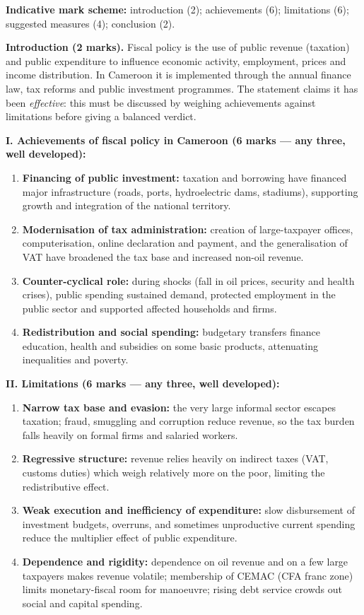 \documentclass[11pt]{article}
\begin{document}
\begin{corrige}
\textbf{Indicative mark scheme:} introduction (2); achievements (6); limitations (6); suggested measures (4); conclusion (2).

\textbf{Introduction (2 marks).} Fiscal policy is the use of public revenue (taxation) and public expenditure to influence economic activity, employment, prices and income distribution. In Cameroon it is implemented through the annual finance law, tax reforms and public investment programmes. The statement claims it has been \emph{effective}: this must be discussed by weighing achievements against limitations before giving a balanced verdict.

\textbf{I. Achievements of fiscal policy in Cameroon (6 marks — any three, well developed):}
\begin{enumerate}
\item \textbf{Financing of public investment:} taxation and borrowing have financed major infrastructure (roads, ports, hydroelectric dams, stadiums), supporting growth and integration of the national territory.
\item \textbf{Modernisation of tax administration:} creation of large-taxpayer offices, computerisation, online declaration and payment, and the generalisation of VAT have broadened the tax base and increased non-oil revenue.
\item \textbf{Counter-cyclical role:} during shocks (fall in oil prices, security and health crises), public spending sustained demand, protected employment in the public sector and supported affected households and firms.
\item \textbf{Redistribution and social spending:} budgetary transfers finance education, health and subsidies on some basic products, attenuating inequalities and poverty.
\end{enumerate}

\textbf{II. Limitations (6 marks — any three, well developed):}
\begin{enumerate}
\item \textbf{Narrow tax base and evasion:} the very large informal sector escapes taxation; fraud, smuggling and corruption reduce revenue, so the tax burden falls heavily on formal firms and salaried workers.
\item \textbf{Regressive structure:} revenue relies heavily on indirect taxes (VAT, customs duties) which weigh relatively more on the poor, limiting the redistributive effect.
\item \textbf{Weak execution and inefficiency of expenditure:} slow disbursement of investment budgets, overruns, and sometimes unproductive current spending reduce the multiplier effect of public expenditure.
\item \textbf{Dependence and rigidity:} dependence on oil revenue and on a few large taxpayers makes revenue volatile; membership of CEMAC (CFA franc zone) limits monetary-fiscal room for manoeuvre; rising debt service crowds out social and capital spending.
\end{enumerate}


\end{corrige}
\end{document}
